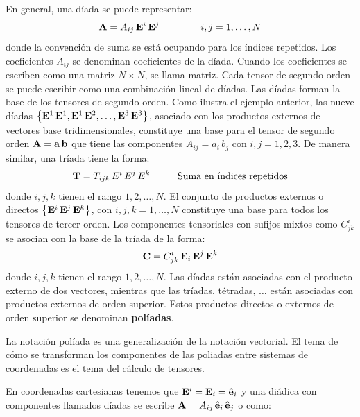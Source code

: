 \documentclass[hidelinks,12pt]{article}
\begin{document}
En general, una díada se puede representar:
\begin{align*}
\vb{A} = A_{ij} \, \vb{E}^{i} \, \vb{E}^{j} \hspace{1.5cm} i, j = 1, \ldots, N
\end{align*}
donde la convención de suma se está ocupando para los índices repetidos. Los coeficientes $A_{ij}$ se denominan coeficientes de la díada. Cuando los coeficientes se escriben como una matriz $N \times N$, se llama matriz. Cada tensor de segundo orden se puede escribir como una combinación lineal de díadas. Las díadas forman la base de los tensores de segundo orden. Como ilustra el ejemplo anterior, las nueve díadas $\left\{ \vb{E}^{1} \, \vb{E}^{1}, \vb{E}^{1} \, \vb{E}^{2}, \ldots, \vb{E}^{3} \, \vb{E}^{3} \right\}$, asociado con los productos externos de vectores base tridimensionales, constituye una base para el tensor de segundo orden $\vb{A} = \vb{a} \, \vb{b}$ que tiene las componentes $A_{ij} = a_{i} \, b_{j}$ con $i, j = 1, 2, 3$. De manera similar, una tríada tiene la forma:
\begin{align*}
\vb{T} = T_{ijk} \, E^{i} \, E^{j} \, E^{k} \hspace{1cm} \text{Suma en índices repetidos}
\end{align*}
donde $i, j, k$ tienen el rango $1, 2, \ldots, N$. El conjunto de productos externos o directos $\left\{ \vb{E}^{i} \, \vb{E}^{j} \, \vb{E}^{k} \right\}$, con $i, j, k = 1, \ldots, N$ constituye una base para todos los tensores de tercer orden. Los componentes tensoriales con sufijos mixtos como $C_{jk}^{i}$ se asocian con la base de la tríada de la forma:
\begin{align*}
\vb{C} = C_{jk}^{i} \, \vb{E}_{i} \, \vb{E}^{j} \, \vb{E}^{k}
\end{align*}
donde $i, j, k$ tienen el rango $1, 2, \ldots, N$. Las díadas están asociadas con el producto externo de dos vectores, mientras que las tríadas, tétradas, $\ldots$ están asociadas con productos externos de orden superior. Estos productos directos o externos de orden superior se denominan \textbf{políadas}.
\par
La notación políada es una generalización de la notación vectorial. El tema de cómo se transforman los componentes de las poliadas entre sistemas de coordenadas es el tema del cálculo de tensores.
\par
En coordenadas cartesianas tenemos que $\vb{E}^{i} = \vb{E}_{i} = \vu{e}_{i}$ y una diádica con componentes llamados díadas se escribe $\vb{A} = A_{ij} \, \vu{e}_{i} \, \vu{e}_{j}$ o como:
\end{document}
